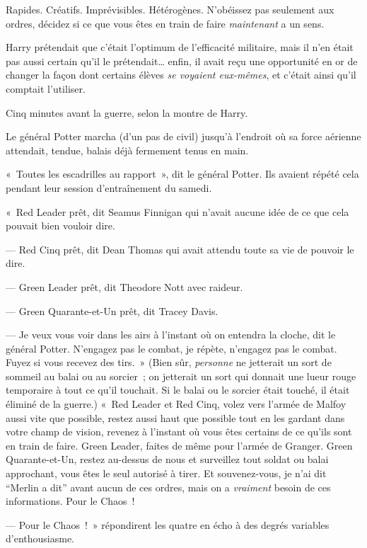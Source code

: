 Rapides.
Créatifs.
Imprévisibles.
Hétérogènes.
N'obéissez pas seulement aux ordres, décidez si ce que vous êtes en train de faire \emph{maintenant} a un sens.

Harry prétendait que c'était l'optimum de l'efficacité militaire, mais il n'en était pas aussi certain qu'il le prétendait… enfin, il avait reçu une opportunité en or de changer la façon dont certains élèves \emph{se voyaient eux-mêmes}, et c'était ainsi qu'il comptait l'utiliser.

Cinq minutes avant la guerre, selon la montre de Harry.

Le général Potter marcha (d'un pas de civil) jusqu'à l'endroit où sa force aérienne attendait, tendue, balais déjà fermement tenus en main.

«~Toutes les escadrilles au rapport~», dit le général Potter.
Ils avaient répété cela pendant leur session d'entraînement du samedi.

«~Red Leader prêt, dit Seamus Finnigan qui n'avait aucune idée de ce que cela pouvait bien vouloir dire.

--- Red Cinq prêt, dit Dean Thomas qui avait attendu toute sa vie de pouvoir le dire.

--- Green Leader prêt, dit Theodore Nott avec raideur.

--- Green Quarante-et-Un prêt, dit Tracey Davis.

--- Je veux vous voir dans les airs à l'instant où on entendra la cloche, dit le général Potter.
N'engagez pas le combat, je répète, n'engagez pas le combat.
Fuyez si vous recevez des tirs.~»
(Bien sûr, \emph{personne} ne jetterait un sort de sommeil au balai ou au sorcier~; on jetterait un sort qui donnait une lueur rouge temporaire à tout ce qu'il touchait.
Si le balai ou le sorcier était touché, il était éliminé de la guerre.) «~Red Leader et Red Cinq, volez vers l'armée de Malfoy aussi vite que possible, restez aussi haut que possible tout en les gardant dans votre champ de vision, revenez à l'instant où vous êtes certains de ce qu'ils sont en train de faire.
Green Leader, faites de même pour l'armée de Granger.
Green Quarante-et-Un, restez au-dessus de nous et surveillez tout soldat ou balai approchant, vous êtes le seul autorisé à tirer.
Et souvenez-vous, je n'ai dit “Merlin a dit” avant aucun de ces ordres, mais on a \emph{vraiment} besoin de ces informations.
Pour le Chaos~!

--- Pour le Chaos~!~»
répondirent les quatre en écho à des degrés variables d'enthousiasme.

